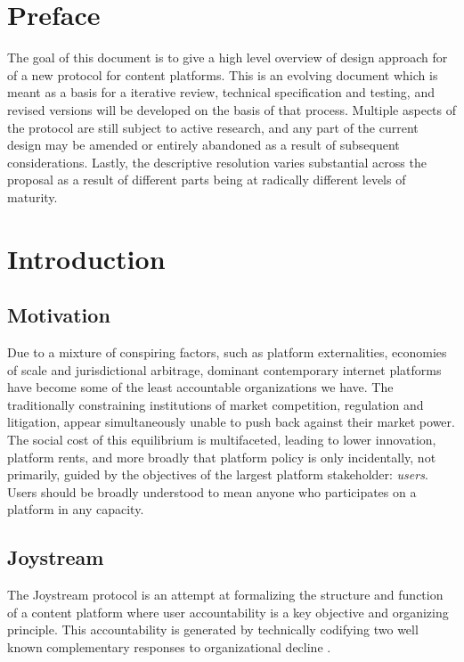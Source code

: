 \documentclass{article}
\begin{document}

\tableofcontents

\section{Preface}

The goal of this document is to give a high level overview of design approach for of a new protocol for content platforms. This is an evolving document which is meant as a basis for a iterative review, technical specification and testing, and revised versions will be developed on the basis of that process. Multiple aspects of the protocol are still subject to active research, and any part of the current design may be amended or entirely abandoned as a result of subsequent considerations. Lastly, the descriptive resolution varies substantial across the proposal as a result of different parts being at radically different levels of maturity.

\section{Introduction}

\subsection{Motivation}

Due to a mixture of conspiring factors, such as platform externalities, economies of scale and jurisdictional arbitrage, dominant contemporary internet platforms have become some of the least accountable organizations we have. The traditionally constraining institutions of market competition, regulation and litigation, appear simultaneously unable to push back against their market power. The social cost of this equilibrium is multifaceted, leading to lower innovation, platform rents, and more broadly that platform policy is only incidentally, not primarily, guided by the objectives of the largest platform stakeholder: \textit{users}. Users should be broadly understood to mean anyone who participates on a platform in any capacity.

\subsection{Joystream}

The Joystream protocol is an attempt at formalizing the structure and function of a content platform where user accountability is a key objective and organizing principle. This accountability is generated by technically codifying two well known complementary responses to organizational decline \cite{hirschman1970exit}.
\end{document}
